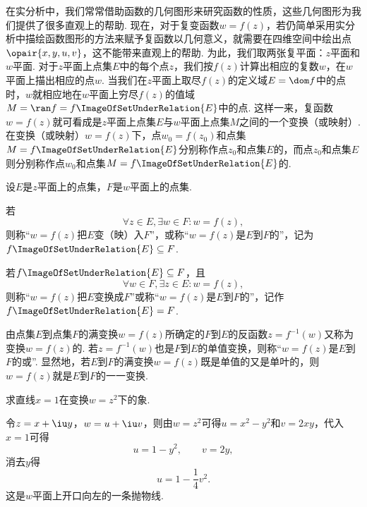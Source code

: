 在实分析中，我们常常借助函数的几何图形来研究函数的性质，这些几何图形为我们提供了很多直观上的帮助.
现在，对于复变函数\(w = f(z)\)，若仍简单采用实分析中描绘函数图形的方法来赋予复函数以几何意义，就需要在四维空间中绘出点\(\opair{x,y,u,v}\)，这不能带来直观上的帮助.
为此，我们取两张复平面：\(z\)平面和\(w\)平面.
对于\(z\)平面上点集\(E\)中的每个点\(z\)，我们按\(f(z)\)计算出相应的复数\(w\)，在\(w\)平面上描出相应的点\(w\).
当我们在\(z\)平面上取尽\(f(z)\)的定义域\(E = \dom f\)中的点时，\(w\)就相应地在\(w\)平面上穷尽\(f(z)\)的值域\(M = \ran f = f\ImageOfSetUnderRelation{E}\)中的点.
这样一来，复函数\(w = f(z)\)就可看成是\(z\)平面上点集\(E\)与\(w\)平面上点集\(M\)之间的一个变换（或映射）.
在变换（或映射）\(w=f(z)\)下，点\(w_0=f(z_0)\)和点集\(M=f\ImageOfSetUnderRelation{E}\)分别称作点\(z_0\)和点集\(E\)的，而点\(z_0\)和点集\(E\)则分别称作点\(w_0\)和点集\(M=f\ImageOfSetUnderRelation{E}\)的.

\begin{definition}
设\(E\)是\(z\)平面上的点集，\(F\)是\(w\)平面上的点集.

若\[
\forall z \in E, \exists w \in F : w = f(z),
\]则称“\(w=f(z)\)把\(E\)变（映）入\(F\)”，或称“\(w=f(z)\)是\(E\)到\(F\)的”，记为\(f\ImageOfSetUnderRelation{E} \subseteq F\).

若\(f\ImageOfSetUnderRelation{E} \subseteq F\)，且\[
\forall w \in F, \exists z \in E : w = f(z),
\]则称“\(w = f(z)\)把\(E\)变换成\(F\)”或称“\(w = f(z)\)是\(E\)到\(F\)的”，记作\(f\ImageOfSetUnderRelation{E} = F\).

由点集\(E\)到点集\(F\)的满变换\(w = f(z)\)所确定的\(F\)到\(E\)的反函数\(z=f^{-1}(w)\)又称为变换\(w = f(z)\)的.
若\(z=f^{-1}(w)\)也是\(F\)到\(E\)的单值变换，则称“\(w = f(z)\)是\(E\)到\(F\)的或”.
显然地，若\(E\)到\(F\)的满变换\(w = f(z)\)既是单值的又是单叶的，则\(w = f(z)\)就是\(E\)到\(F\)的一一变换.
\end{definition}

\begin{example}
求直线\(x=1\)在变换\(w=z^2\)下的象.
\begin{solution}
令\(z=x+\iu y\)，\(w=u+\iu v\)，则由\(w=z^2\)可得\(u=x^2-y^2\)和\(v=2xy\)，代入\(x=1\)可得\[
u=1-y^2, \qquad v=2y,
\]消去\(y\)得\[
u=1-\frac{1}{4} v^2.
\]这是\(w\)平面上开口向左的一条抛物线.
\end{solution}
\end{example}

